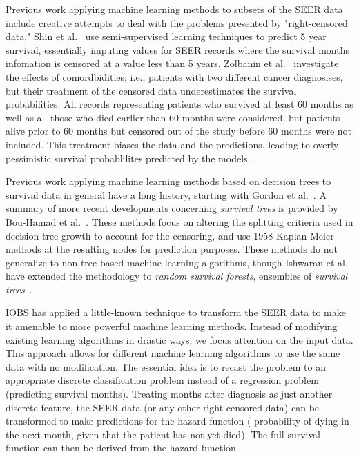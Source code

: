 \documentclass[10pt,letterpaper]{article}
\begin{document}
Previous work applying machine learning methods to subsets of the SEER data include creative attempts to deal with the problems presented by  "right-censored data." Shin et al.~\cite{ISI:000337467400005} use semi-supervised learning techniques to predict 5 year survival, essentially imputing values for SEER records where the survival months infomation is censored at a value less than 5 years. Zolbanin et al.~\cite{ISI:000355882700012} investigate the effects of comordbidities; i.e., patients with two different cancer diagnosises, but their treatment of the censored data underestimates the survival probabilities. All records representing patients who survived at least 60 months as well as all those who died earlier than 60 months were considered, but patients alive prior to 60 months but censored out of the study before 60 months were not included. This treatment biases the data and the predictions, leading to overly pessimistic survival probablilites predicted by the models.


Previous work applying machine learning methods based on decision trees to survival data in general have a long history, starting with Gordon et al.~\cite{Gordon19851065}. A summary of more recent developments concerning \emph{survival trees} is provided by Bou-Hamad et al.~\cite{Bou-Hamad201144}. These methods focus on altering the splitting critieria used in decision tree growth to account for the censoring, and use 1958 Kaplan-Meier methods at the resulting nodes for prediction purposes. These methods do not generalize to non-tree-based machine learning algorithms, though Ishwaran et al. have extended the methodology to \emph{random survival forests}, ensembles of \emph{survival trees}~\cite{Ishwaran20101056}.


IOBS has applied a little-known technique to transform the SEER data to make it amenable to more powerful machine learning methods. Instead of modifying existing learning algorithms in drastic ways, we focus attention on the input data. This approach allows for different machine learning algorithms to use the same data with no modification. The essential idea is to recast the problem to an appropriate discrete classification problem instead of a regression problem (predicting survival months). Treating months after diagnosis as just another discrete feature, the SEER data (or any other right-censored data) can be transformed to make predictions for the hazard function (
 probability of dying in the next month, given that the patient has not yet died).
The full survival function can then be derived from the hazard function.
\end{document}
